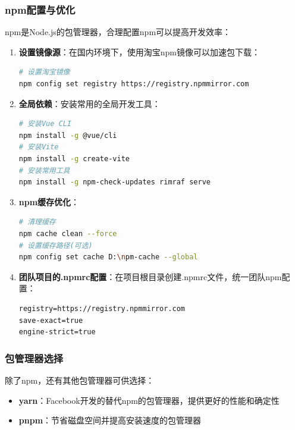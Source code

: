 \subsubsection{npm配置与优化}\label{npmux914dux7f6eux4e0eux4f18ux5316}

npm是Node.js的包管理器，合理配置npm可以提高开发效率：

\begin{enumerate}
\def\labelenumi{\arabic{enumi}.}
\item
  \textbf{设置镜像源}：在国内环境下，使用淘宝npm镜像可以加速包下载：

\begin{lstlisting}[language=bash]
# 设置淘宝镜像
npm config set registry https://registry.npmmirror.com
\end{lstlisting}
\item
  \textbf{全局依赖}：安装常用的全局开发工具：

\begin{lstlisting}[language=bash]
# 安装Vue CLI
npm install -g @vue/cli
# 安装Vite
npm install -g create-vite
# 安装常用工具
npm install -g npm-check-updates rimraf serve
\end{lstlisting}
\item
  \textbf{npm缓存优化}：

\begin{lstlisting}[language=bash]
# 清理缓存
npm cache clean --force
# 设置缓存路径(可选)
npm config set cache D:\npm-cache --global
\end{lstlisting}
\item
  \textbf{团队项目的.npmrc配置}：在项目根目录创建.npmrc文件，统一团队npm配置：

\begin{lstlisting}
registry=https://registry.npmmirror.com
save-exact=true
engine-strict=true
\end{lstlisting}
\end{enumerate}

\subsubsection{包管理器选择}\label{ux5305ux7ba1ux7406ux5668ux9009ux62e9}

除了npm，还有其他包管理器可供选择：

\begin{itemize}
\tightlist
\item
  \textbf{yarn}：Facebook开发的替代npm的包管理器，提供更好的性能和确定性
\item
  \textbf{pnpm}：节省磁盘空间并提高安装速度的包管理器
\end{itemize}

